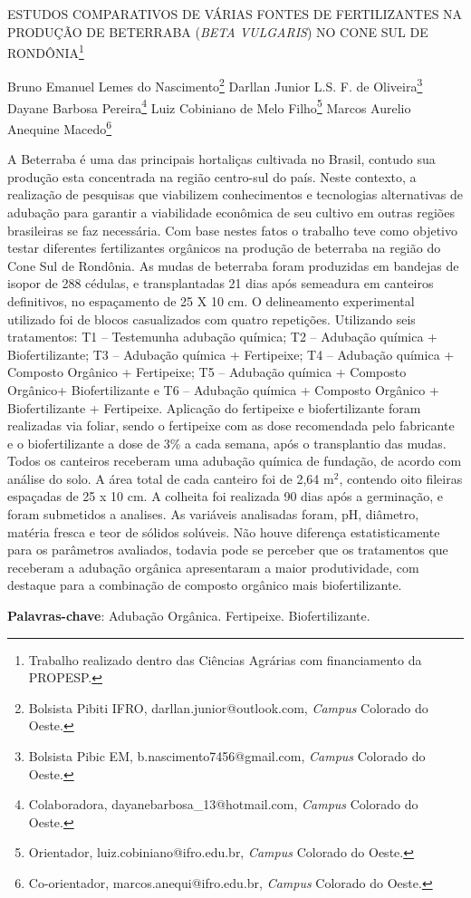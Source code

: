 \documentclass[article,12pt,onesidea,4paper,english,brazil]{abntex2}
\begin{document}
	
	
	\frenchspacing 
	
	\begin{center}
		\LARGE ESTUDOS COMPARATIVOS DE VÁRIAS FONTES DE FERTILIZANTES NA
		PRODUÇÃO DE BETERRABA (\textit{BETA VULGARIS}) NO CONE SUL DE
		RONDÔNIA\footnote{Trabalho realizado dentro das Ciências Agrárias com financiamento da PROPESP.}
		
		\normalsize
		Bruno Emanuel Lemes do Nascimento\footnote{Bolsista Pibiti IFRO, darllan.junior@outlook.com, \textit{Campus} Colorado do Oeste.} 
		Darllan Junior L.S. F. de Oliveira\footnote{Bolsista Pibic EM, b.nascimento7456@gmail.com, \textit{Campus} Colorado do Oeste.} 
		Dayane Barbosa Pereira\footnote{Colaboradora, dayanebarbosa\_13@hotmail.com, \textit{Campus} Colorado do Oeste.} 
		Luiz Cobiniano de Melo Filho\footnote{Orientador, luiz.cobiniano@ifro.edu.br, \textit{Campus} Colorado do Oeste.}
		Marcos Aurelio Anequine Macedo\footnote{Co-orientador, marcos.anequi@ifro.edu.br, \textit{Campus} Colorado do Oeste.} 
	\end{center}
	
	\noindent A Beterraba é uma das principais hortaliças cultivada no Brasil, contudo sua
	produção esta concentrada na região centro-sul do país. Neste contexto, a
	realização de pesquisas que viabilizem conhecimentos e tecnologias alternativas de
	adubação para garantir a viabilidade econômica de seu cultivo em outras regiões
	brasileiras se faz necessária. Com base nestes fatos o trabalho teve como objetivo
	testar diferentes fertilizantes orgânicos na produção de beterraba na região do Cone Sul de Rondônia. As mudas de beterraba foram produzidas em bandejas de isopor
	de 288 cédulas, e transplantadas 21 dias após semeadura em canteiros definitivos,
	no espaçamento de 25 X 10 cm. O delineamento experimental utilizado foi de blocos
	casualizados com quatro repetições. Utilizando seis tratamentos: T1 – Testemunha
	adubação química; T2 – Adubação química + Biofertilizante; T3 – Adubação química
	+ Fertipeixe; T4 – Adubação química + Composto Orgânico + Fertipeixe; T5 –
	Adubação química + Composto Orgânico+ Biofertilizante e T6 – Adubação química +
	Composto Orgânico + Biofertilizante + Fertipeixe. Aplicação do fertipeixe e
	biofertilizante foram realizadas via foliar, sendo o fertipeixe com as dose
	recomendada pelo fabricante e o biofertilizante a dose de 3\% a cada semana, após
	o transplantio das mudas. Todos os canteiros receberam uma adubação química de
	fundação, de acordo com análise do solo. A área total de cada canteiro foi de 2,64
	m$^2$, contendo oito fileiras espaçadas de 25 x 10 cm. A colheita foi realizada 90 dias
	após a germinação, e foram submetidos a analises. As variáveis analisadas foram,
	pH, diâmetro, matéria fresca e teor de sólidos solúveis. Não houve diferença
	estatisticamente para os parâmetros avaliados, todavia pode se perceber que os
	tratamentos que receberam a adubação orgânica apresentaram a maior
	produtividade, com destaque para a combinação de composto orgânico mais
	biofertilizante.
	
	\vspace{\onelineskip}
	
	\noindent
	\textbf{Palavras-chave}: Adubação Orgânica. Fertipeixe. Biofertilizante.	
	
\end{document}
